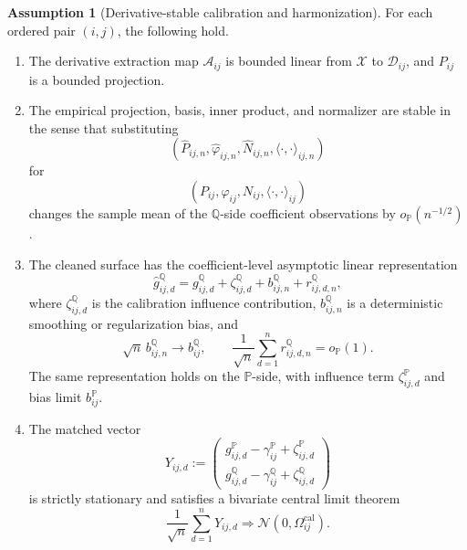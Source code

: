 \documentclass[11pt,a4paper]{amsart}
\theoremstyle{plain}
\theoremstyle{definition}
\newtheorem{assumption}[theorem]{Assumption}
\theoremstyle{remark}
\newcommand{\PP}{\mathbb{P}}
\newcommand{\QQ}{\mathbb{Q}}
\newcommand{\cA}{\mathcal{A}}
\newcommand{\cD}{\mathcal{D}}
\newcommand{\cX}{\mathcal{X}}
\begin{document}
\begin{assumption}[Derivative-stable calibration and harmonization]\label{ass:derivative-stable-calibration}
For each ordered pair \((i,j)\), the following hold.
\begin{enumerate}[label=(\roman*)]
\item The derivative extraction map \(\cA_{ij}\) is bounded linear from \(\cX\) to \(\cD_{ij}\),
and \(P_{ij}\) is a bounded projection.
\item The empirical projection, basis, inner product, and normalizer are stable in the sense that
substituting
\[
        (\widehat P_{ij,n},\widehat\varphi_{ij,n},\widehat N_{ij,n},
        \langle\cdot,\cdot\rangle_{ij,n})
\]
for
\[
        (P_{ij},\varphi_{ij},N_{ij},\langle\cdot,\cdot\rangle_{ij})
\]
changes the sample mean of the \(\QQ\)-side coefficient observations by \(o_\PP(n^{-1/2})\).
\item The cleaned surface has the coefficient-level asymptotic linear representation
\[
        \widehat g_{ij,d}^{\QQ}
        =
        g_{ij,d}^{\QQ}
        +
        \zeta_{ij,d}^{\QQ}
        +
        b_{ij,n}^{\QQ}
        +
        r_{ij,d,n}^{\QQ},
\]
where \(\zeta_{ij,d}^{\QQ}\) is the calibration influence contribution,
\(b_{ij,n}^{\QQ}\) is a deterministic smoothing or regularization bias, and
\[
        \sqrt n\, b_{ij,n}^{\QQ}\to b_{ij}^{\QQ},
        \qquad
        \frac1{\sqrt n}\sum_{d=1}^n r_{ij,d,n}^{\QQ}=o_\PP(1).
\]
The same representation holds on the \(\PP\)-side, with influence term
\(\zeta_{ij,d}^{\PP}\) and bias limit \(b_{ij}^{\PP}\).
\item The matched vector
\[
        Y_{ij,d}
        :=
        \begin{pmatrix}
                g_{ij,d}^{\PP}-\gamma_{ij}^{\PP}+\zeta_{ij,d}^{\PP}\\
                g_{ij,d}^{\QQ}-\gamma_{ij}^{\QQ}+\zeta_{ij,d}^{\QQ}
        \end{pmatrix}
\]
is strictly stationary and satisfies a bivariate central limit theorem
\[
        \frac1{\sqrt n}\sum_{d=1}^nY_{ij,d}
        \Rightarrow
        \mathcal N(0,\Omega_{ij}^{\mathrm{cal}}).
\]
\end{enumerate}
\end{assumption}
\end{document}
